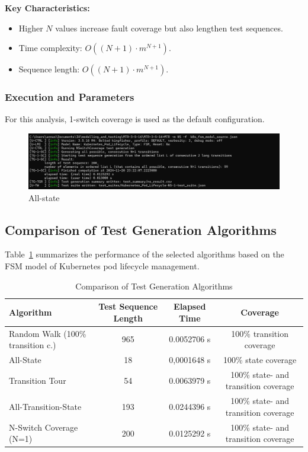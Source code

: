 \documentclass[main.tex]{subfiles}
\begin{document}
\textbf{Key Characteristics:}
\begin{itemize}
    \item Higher $N$ values increase fault coverage but also lengthen test sequences.
    \item Time complexity: $O((N+1) \cdot m^{N+1})$.
    \item Sequence length: $O((N+1) \cdot m^{N+1})$.
\end{itemize}

\subsubsection{Execution and Parameters}
For this analysis, 1-switch coverage is used as the default configuration.
\begin{figure}[H]
    \centering
    \includegraphics[width=\textwidth]{test_results/n-switch.png}
    \caption{All-state}
    \label{fig:all_state}
\end{figure}

\subsection{Comparison of Test Generation Algorithms}

Table~\ref{tab:algorithm_comparison} summarizes the performance of the selected algorithms based on the FSM model of Kubernetes pod lifecycle management.

\begin{table}[H]
\centering
\caption{Comparison of Test Generation Algorithms}
\label{tab:algorithm_comparison}
\begin{tabular}{|l|c|c|c|}
\hline
\textbf{Algorithm}     & \textbf{Test Sequence Length}     & \textbf{Elapsed Time}      & \textbf{Coverage} \\ \hline
Random Walk (100\% transition c.)     & 965     & 0.0052706 s    & 100\% transition coverage  \\ \hline
All-State     & 18     & 0,0001648 s    & 100\% state coverage \\ \hline
Transition Tour     & 54     & 0.0063979 s  & 100\% state- and transition coverage    \\ \hline
All-Transition-State     & 193     & 0.0244396 s     & 100\% state- and transition coverage    \\ \hline
N-Switch Coverage (N=1)     & 200     & 0.0125292 s     & 100\% state- and transition coverage    \\ \hline
\end{tabular}
\end{table}
\end{document}
